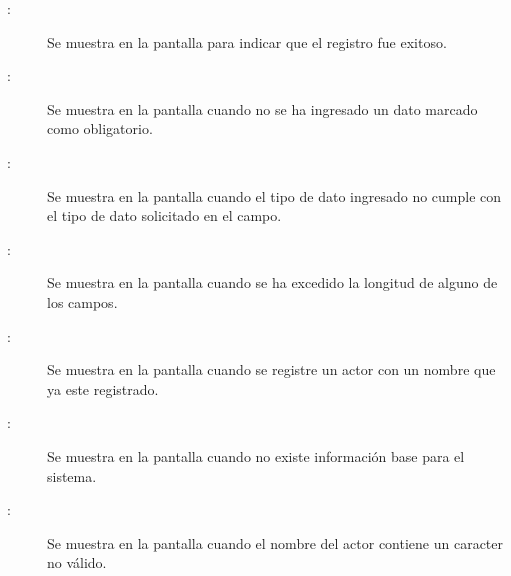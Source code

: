 	
\begin{description}
	\item[:] Se muestra en la pantalla  para indicar que el registro fue exitoso.
	\item[:] Se muestra en la pantalla  cuando no se ha ingresado un dato marcado como obligatorio.
	\item[:] Se muestra en la pantalla  cuando el tipo de dato ingresado no cumple con el tipo de dato solicitado en el campo.
	\item[:] Se muestra en la pantalla  cuando se ha excedido la longitud de alguno de los campos.
	\item[:] Se muestra en la pantalla  cuando se registre un actor con un nombre que ya este registrado.
	\item[:] Se muestra en la pantalla  cuando no existe información base para el sistema.
	\item[:] Se muestra en la pantalla  cuando el nombre del actor contiene un caracter no válido.
\end{description}
